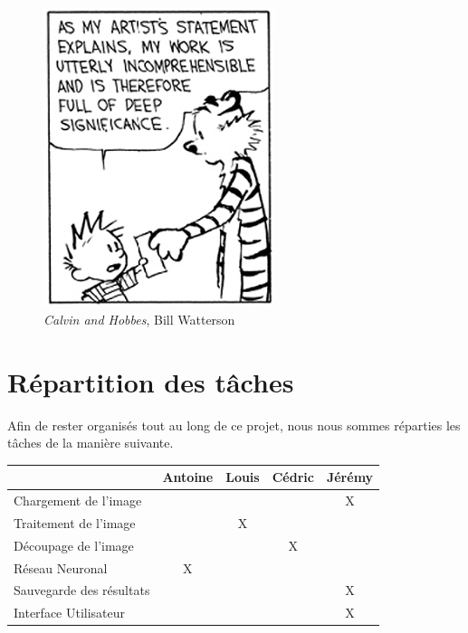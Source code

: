 \documentclass[12pt]{report}
\begin{document}
\begin{figure}
    \centering
    \includegraphics[width=0.6\textwidth]{project_mood_S1}
    \caption*{\textit{Calvin and Hobbes}, Bill Watterson}
\end{figure}

\chapter{Répartition des tâches}

Afin de rester organisés tout au long de ce projet, nous nous sommes réparties les tâches de la manière suivante.

\begin{center}
    \begin{tabular}{@{} l *4c @{}}
        \toprule
        \multicolumn{1}{c}{}    & \textbf{Antoine}  & \textbf{Louis}  & \textbf{Cédric} & \textbf{Jérémy} \\ 
        \midrule
        Chargement de l'image & & & & X \\
        Traitement de l'image & & X & & \\
        Découpage de l'image & & & X & \\
        Réseau Neuronal & X & & & \\
        Sauvegarde des résultats & & & & X \\
        Interface Utilisateur & & & & X \\
        \bottomrule
    \end{tabular}
\end{center}
\end{document}
